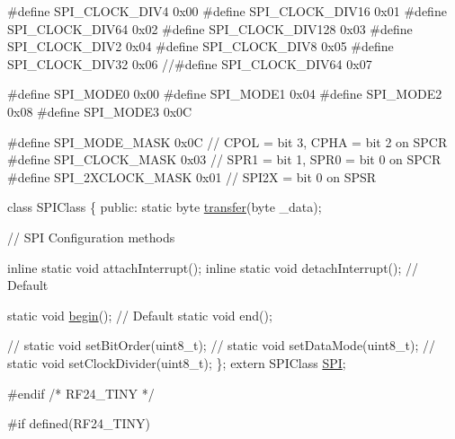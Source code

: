 \begin{DoxyCodeInclude}
\textcolor{preprocessor}{#define SPI\_CLOCK\_DIV4 0x00}
\textcolor{preprocessor}{#define SPI\_CLOCK\_DIV16 0x01}
\textcolor{preprocessor}{#define SPI\_CLOCK\_DIV64 0x02}
\textcolor{preprocessor}{#define SPI\_CLOCK\_DIV128 0x03}
\textcolor{preprocessor}{#define SPI\_CLOCK\_DIV2 0x04}
\textcolor{preprocessor}{#define SPI\_CLOCK\_DIV8 0x05}
\textcolor{preprocessor}{#define SPI\_CLOCK\_DIV32 0x06}
\textcolor{comment}{//#define SPI\_CLOCK\_DIV64 0x07}

\textcolor{preprocessor}{#define SPI\_MODE0 0x00}
\textcolor{preprocessor}{#define SPI\_MODE1 0x04}
\textcolor{preprocessor}{#define SPI\_MODE2 0x08}
\textcolor{preprocessor}{#define SPI\_MODE3 0x0C}

\textcolor{preprocessor}{#define SPI\_MODE\_MASK 0x0C  // CPOL = bit 3, CPHA = bit 2 on SPCR}
\textcolor{preprocessor}{#define SPI\_CLOCK\_MASK 0x03  // SPR1 = bit 1, SPR0 = bit 0 on SPCR}
\textcolor{preprocessor}{#define SPI\_2XCLOCK\_MASK 0x01  // SPI2X = bit 0 on SPSR}

\textcolor{keyword}{class }SPIClass \{
\textcolor{keyword}{public}:
  \textcolor{keyword}{static} byte \hyperlink{group__Porting__SPI_gad8a210abb2138c105350cc91972edfa9}{transfer}(byte \_data);

  \textcolor{comment}{// SPI Configuration methods}

  \textcolor{keyword}{inline} \textcolor{keyword}{static} \textcolor{keywordtype}{void} attachInterrupt();
  \textcolor{keyword}{inline} \textcolor{keyword}{static} \textcolor{keywordtype}{void} detachInterrupt(); \textcolor{comment}{// Default}

  \textcolor{keyword}{static} \textcolor{keywordtype}{void} \hyperlink{group__Porting__SPI_gaf79095574842d60a6297aa5b01b6185f}{begin}(); \textcolor{comment}{// Default}
  \textcolor{keyword}{static} \textcolor{keywordtype}{void} end();

\textcolor{comment}{//  static void setBitOrder(uint8\_t);}
\textcolor{comment}{//  static void setDataMode(uint8\_t);}
\textcolor{comment}{//  static void setClockDivider(uint8\_t);}
\};
\textcolor{keyword}{extern} SPIClass \hyperlink{group__Porting__SPI_gacd293e741d829f9578b8c5ee49833608}{SPI};

\textcolor{preprocessor}{#endif }\textcolor{comment}{/* RF24\_TINY */}\textcolor{preprocessor}{}


\textcolor{preprocessor}{#if defined(RF24\_TINY)}


\end{DoxyCodeInclude}
